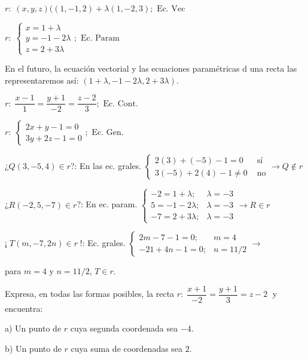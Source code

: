 \begin{proofw}\renewcommand{\qedsymbol}{$\diamond$}

\noindent $r:\; (x,y,z)((1,-1,2)+\lambda(1,-2,3);\text{ Ec. Vec}$

\noindent $r:\; \begin{cases} x=1+\lambda \\ y=-1-2\lambda \\ z=2+3\lambda \end{cases}; \text{ Ec. Param}$

\noindent \textcolor{gris}{En el futuro, la ecuación vectorial y las ecuaciones paramétricas d una recta las representaremos así: $(1+\lambda,-1-2\lambda,2+3\lambda)$.}

\noindent $r:\; \dfrac{x-1}{1}=\dfrac{y+1}{-2}=\dfrac{z-2}{3}; \text{ Ec. Cont.}$

\noindent $r:\; \begin{cases} 2x+y-1=0  \\ 3y+2z-1=0  \end{cases} ;\text{ Ec. Gen.}$

\noindent ¿$Q(3,-5,4)\in r$?: En las ec. grales. $\begin{cases} 2(3)+(-5)-1=0 & \text{ sí}  \\ 3(-5)+2(4)-1\neq 0 & \text{ no} \end{cases} \to Q \notin r$

\noindent ¿$R(-2,5,-7)\in r$?: En ec. param. $\begin{cases} -2=1+\lambda ;& \lambda=-3\\5=-1-2\lambda ;& \lambda=-3\\-7=2+3\lambda ;& \lambda= -3\end{cases} \to R\in r$

\noindent ¡$\;T(m,-7,2n)\in r\;$!: Ec. grales. $\begin{cases} 2m-7-1=0 ;&m=4 \\ -21+4n-1=0 ;&n=11/2  \end{cases} \to $ 

\noindent para $m=4$ y $n=11/2$, $T\in r$.
	
\end{proofw}


\begin{ejre}
	Expresa, en todas las formas posibles, la recta $r:\; \dfrac{x+1}{-2}=\dfrac{y+1}{3}=z-2\;$ y encuentra:
	
	a) Un punto de $r$ cuya segunda coordenada sea $-4$.
	
	b) Un punto de $r$ cuya suma de coordenadas sea $2$.
\end{ejre}

